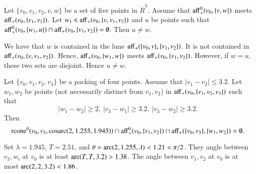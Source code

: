 \begin{tarskidata}
\begin{tarski}
\begin{lemma}
Let $\{v_0,v_1,v_2,v,w\}$ be a set of five points in $\ring{R}^3$.
Assume that ${\operatorname{aff}}_+^0(v_0,\{v,w\})$ meets ${\operatorname{aff}}_+(v_0,\{v_1,v_2\})$.
Let $w_1\in {\operatorname{aff}}_+(v_0,\{v,v_1,v_2\})$ and $u$ be points such
that ${\operatorname{aff}}_+^0(v_0,\{w_1,u\})\cap {\operatorname{aff}}_+(v_0,\{v_1,v_2\})=\emptyset$.
Then $u\ne w$.
\end{lemma}

\begin{proved} 
We have that $w$ is contained in the lune ${\operatorname{aff}}_+(\{v_0,v\},\{v_1,v_2\})$.
It is not contained in ${\operatorname{aff}}_+(v_0,\{v,v_1,v_2\})$.  Hence,
${\operatorname{aff}}_+(v_0,\{w_1,w\})$ meets ${\operatorname{aff}}_+(v_0,\{v_1,v_2\})$.  However,
if $w=u$, these two sets are disjoint.  Hence $u\ne w$.
\swallowed\end{proved}
\end{tarski}



\begin{tarski}

\begin{lemma}
Let $\{v_0,v_1,v_2,v_3\}$ be a packing of four points.
Assume that $|v_1-v_2|\le 3.2$.  Let $w_1,w_2$ be points (not necessarily
distinct from $v_1,v_2$)
in ${\operatorname{aff}}_+(v_0,\{v_1,v_2,v_3\})$ such that
  $$|w_1-w_2|\ge 2,\ |v_3-w_1|\ge 3.2,\ |v_3-w_2|\ge 3.2.
  $$
Then 
  $${\operatorname{rcone}}^0(v_0,v_3,\operatorname{cosarc}(2,1.255,1.945)) \cap {\operatorname{aff}}_+^0(v_0,\{v_1,v_2\})
  \cap {\operatorname{aff}}_+(\{v_0,v_3\},\{w_1,w_2\})
=\emptyset .
  $$
\end{lemma}


\begin{proved}
Set $\lambda=1.945$, $T=2.51$, and
    $\theta = \operatorname{arc}(2,1.255,\lambda)< 1.21 <\pi/2$.  
They angle between $v_3,w_i$ at $v_0$ is at least
$\operatorname{arc}(T,T,3.2)>1.38$. The angle between
$v_1,v_2$ at $v_0$ is at most
$\operatorname{arc}(2,2,3.2)<1.86$.


\end{proved}
\end{tarski}
\end{tarskidata}
